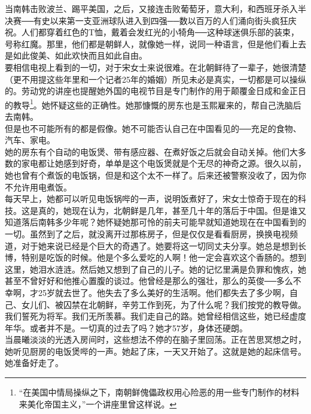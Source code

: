 当南韩击败波兰、踢平美国，之后，又接连击败葡萄牙，意大利，和西班牙杀入半决赛──有史以来第一支亚洲球队进入到四强──数以百万的人们涌向街头疯狂庆祝。人们都穿着红色的T恤，戴着会发红光的小犄角──这种球迷俱乐部的装束，号称红魔。那里，他们都是朝鲜人，就像她一样，说同一种语言，但是他们看上去是如此俊美、如此欢快而且如此自由。\\

要相信电视上看到的一切，对于宋女士来说很难。在北朝鲜待了一辈子，她很清楚（更不用提这些年里和一个记者25年的婚姻）所见未必是真实，一切都是可以操纵的。劳动党的讲座也提醒她外国的电视节目是专门制作的用于颠覆金日成和金正日的教导\footnote{“在美国中情局操纵之下，南朝鲜傀儡政权用心险恶的用一些专门制作的材料来美化帝国主义，”一个讲座里曾这样说。}。她怀疑这些的正确性。她那慷慨的房东也是玉熙雇来的，帮自己洗脑后去南韩。\\

但是也不可能所有的都是假像。她不可能否认自己在中国看见的──充足的食物、汽车、家电。\\

她的房东有个自动的电饭煲、带有感应器、在煮好饭之后就会自动关掉。他们大多数的家电都让她感到好奇，单单是这个电饭煲就是个无尽的神奇之源。很久以前，她也曾有个煮饭的电饭锅，但是和这个太不一样了。后来还被警察没收了，因为你不允许用电煮饭。\\

每天早上，她都可以听见电饭锅哔的一声，说明饭煮好了，宋女士惊奇于现在的科技。这是真的，她现在认为，北朝鲜是几年，甚至几十年的落后于中国。但是谁又知道落后南韩多少年呢？她怀疑她那可怜的前夫可能早就知道她现在在中国看到的一切。虽然到了之后，就没离开过那栋房子，但是仅仅是看看厨房，换换电视频道，对于她来说已经是个巨大的奇遇了。她要将这一切同丈夫分享。她总是想到长博，特别是吃饭的时候。他是个多么爱吃的人啊！他一定会喜欢这个香肠的。想到这里，她泪水涟涟。然后她又想到了自己的儿子。她的记忆里满是负罪和愧疚，她甚至不曾好好和他推心置腹的谈过。他曾经是那么的强壮，那么的英俊──多么不幸啊，才25岁就去世了。他失去了多么美好的生活啊。他们都失去了多少啊，自己、女儿们、被囚禁在北朝鲜，辛劳工作到死，为了什么呢？我们按党的教导做。我们誓死为将军。我们无所羡慕。我们走自己的路。她曾经相信这些，她已经虚度年华。或者并不是。一切真的过去了吗？她才57岁，身体还硬朗。\\

当晨曦淡淡的光透入房间时，这些想法不停的在脑子里回荡。正在苦思冥想之时，她听见厨房的电饭煲哔的一声。她起了床，一天又开始了。这就是她的起床信号。她准备好走了。\\
